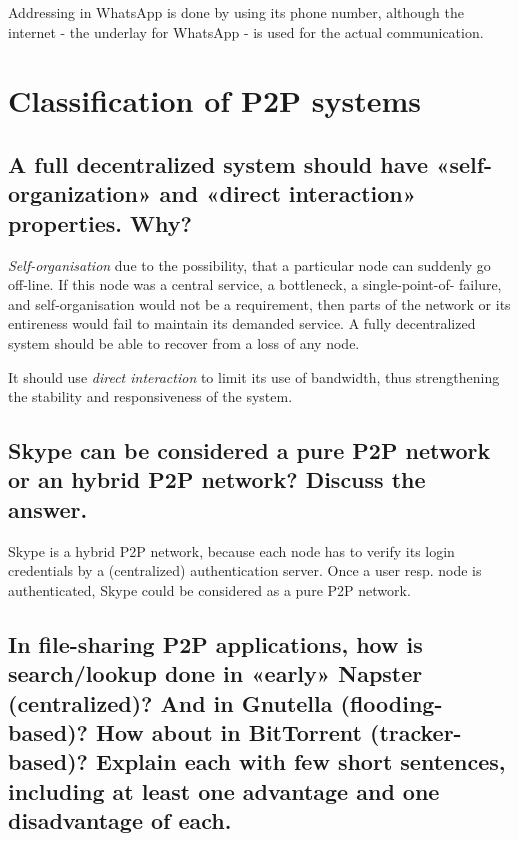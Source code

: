 \documentclass{article}
\begin{document}
Addressing in WhatsApp is done by using its phone number, although the internet
- the underlay for WhatsApp -  is used for the actual communication.

\section{Classification of P2P systems}

\subsection{A full decentralized system should have «self-organization» and
«direct interaction» properties. Why?}

\textit{Self-organisation} due to the possibility, that a particular node can
suddenly go off-line. If this node was a central service, a bottleneck, a
single-point-of- failure, and self-organisation would not be a requirement, then
parts of the network or its entireness would fail to maintain its demanded
service. A fully decentralized system should be able to recover from a loss of
any node.

It should use \textit{direct interaction} to limit its use of bandwidth, thus strengthening the stability and responsiveness of the system.

\subsection{Skype can be considered a pure P2P network or an hybrid P2P network?
Discuss the answer.}

Skype is a hybrid P2P network, because each node has to verify its login
credentials by a (centralized) authentication server. Once a user resp. node is
authenticated, Skype could be considered as a pure P2P network.

\subsection{In file-sharing P2P applications, how is search/lookup done in
«early» Napster (centralized)? And in Gnutella (flooding-based)? How about in
BitTorrent (tracker-based)? Explain each with few short sentences, including
at least one advantage and one disadvantage of each.}
\end{document}
